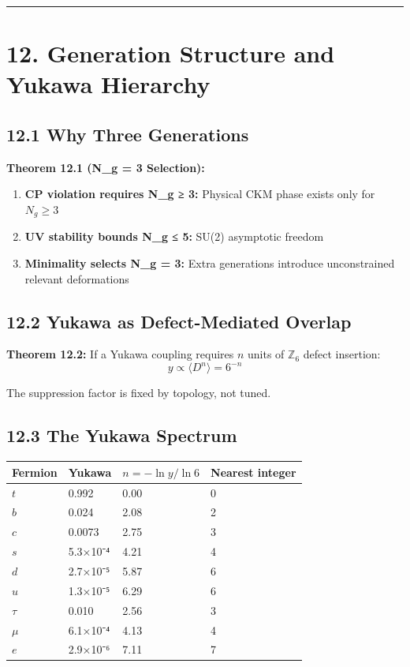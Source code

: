 \begin{center}\rule{0.5\linewidth}{0.5pt}\end{center}

\section{12. Generation Structure and Yukawa Hierarchy}\label{12-generation-structure-and-yukawa-hierarchy}

\subsection{12.1 Why Three Generations}\label{121-why-three-generations}

\textbf{Theorem 12.1 (N\_g = 3 Selection):}

\begin{enumerate}
\def\labelenumi{\arabic{enumi}.}
\tightlist
\item
  \textbf{CP violation requires N\_g ≥ 3:} Physical CKM phase exists only for \(N_g \geq 3\)
\item
  \textbf{UV stability bounds N\_g ≤ 5:} SU(2) asymptotic freedom
\item
  \textbf{Minimality selects N\_g = 3:} Extra generations introduce unconstrained relevant deformations
\end{enumerate}

\subsection{12.2 Yukawa as Defect-Mediated Overlap}\label{122-yukawa-as-defect-mediated-overlap}

\textbf{Theorem 12.2:} If a Yukawa coupling requires \(n\) units of \(\mathbb{Z}_6\) defect insertion: \[y \propto \langle D^n \rangle = 6^{-n}\]

The suppression factor is fixed by topology, not tuned.

\subsection{12.3 The Yukawa Spectrum}\label{123-the-yukawa-spectrum}

{\def\LTcaptype{none} %
\begin{longtable}[]{@{}llll@{}}
\toprule\noalign{}
Fermion & Yukawa & \(n = -\ln y / \ln 6\) & Nearest integer \\
\midrule\noalign{}
\endhead
\bottomrule\noalign{}
\endlastfoot
\(t\) & 0.992 & 0.00 & 0 \\
\(b\) & 0.024 & 2.08 & 2 \\
\(c\) & 0.0073 & 2.75 & 3 \\
\(s\) & 5.3×10⁻⁴ & 4.21 & 4 \\
\(d\) & 2.7×10⁻⁵ & 5.87 & 6 \\
\(u\) & 1.3×10⁻⁵ & 6.29 & 6 \\
\(\tau\) & 0.010 & 2.56 & 3 \\
\(\mu\) & 6.1×10⁻⁴ & 4.13 & 4 \\
\(e\) & 2.9×10⁻⁶ & 7.11 & 7 \\
\end{longtable}
}


